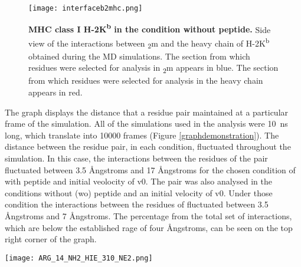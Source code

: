 \documentclass[11pt,twocolumn]{article}
\def\plus{\texttt{+}}
\newcommand{\kb}{H-2K\textsuperscript{b}\xspace}
\newcommand{\angstr}{{\AA}ngstroms\xspace}
\newcommand{\btm}{\textbeta\textsubscript{2}m\xspace}
\begin{document}
\begin{figure}
\texttt{[image: interfaceb2mhc.png]}
\caption{\textbf{MHC class I \kb in the condition without peptide.} Side view of the interactions between \btm and the heavy chain of \kb obtained during the MD simulations. The section from which residues were selected for analysis in \btm appears in blue. The section from which residues were selected for analysis in the heavy chain appears in red.}
\label{interface}
\end{figure}

The graph displays the distance that a residue pair maintained at a particular frame of the simulation. All of the simulations used in the analysis were \SI{10}{\nano\second} long, which translate into 10000 frames (Figure \ref{graphdemonstration}). The distance between the residue pair, in each condition, fluctuated throughout the simulation. In this case, the interactions between the residues of the pair fluctuated between 3.5 \angstr and  17 \angstr for the chosen condition of with peptide and initial veolocity of v0. The pair was also analysed in the conditions without (wo) peptide and an initial velocity of v0. Under those condition the interactions between the residues of  fluctuated between 3.5 \angstr and  7 \angstr.
The percentage from the total set of interactions, which are below the established rage of four \angstr, can be seen on the top right corner of the graph. 

\begin{figure*}
\begin{center}
\texttt{[image: ARG\_14\_NH2\_HIE\_310\_NE2.png]}
\caption{\textbf{Example of a graph generated by \texttt{gnuplot} after processing the first line in the residue pair file (Listing \ref{resatexample}) with the two scripts (Listing \ref{Tcl.script} and \ref{generategnuplot.sh}).} The distance between the two interacting atoms for each of the two residue pairs represented in every frame of the simulation as $\plus$ or a $\times$. One pair was analysed in the conditions with peptide and initial velocity of v0. The other pair was analysed in the conditions without peptide and initial velocity of v0. The percentage calculated in Listing \ref{generategnuplot.sh} is displayed in the top right corner and the name of the analysed pair can be seen on the top of the graph. The blue line indicates the 4 \angstr cutoff value.}
\label{graphdemonstration}
\end{center}
\end{figure*}
\end{document}
